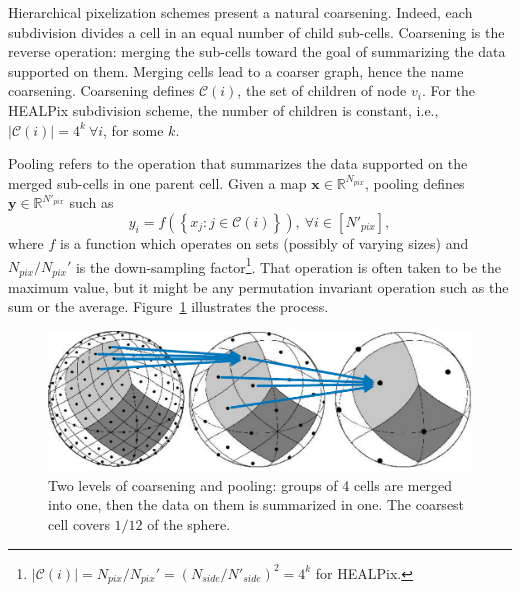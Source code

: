 \documentclass[final,twocolumn,3p,times,authoryear]{elsarticle}
\newcommand{\figref}[1]{Figure~\ref{fig:#1}}
\renewcommand{\b}[1]{{\bm{#1}}}   %
\newcommand{\1}{\b{1}}              %
\newcommand{\0}{\b{0}}              %
\newcommand{\C}{\mathcal{C}}
\newcommand{\x}{\b{x}}
\newcommand{\y}{\b{y}}
\newcommand{\R}{\mathbb{R}}
\begin{document}
Hierarchical pixelization schemes present a natural coarsening. Indeed, each subdivision divides a cell in an equal number of child sub-cells. Coarsening is the reverse operation: merging the sub-cells toward the goal of summarizing the data supported on them. Merging cells lead to a coarser graph, hence the name coarsening. Coarsening defines $\C(i)$, the set of children of node $v_i$. For the HEALPix subdivision scheme, the number of children is constant, i.e., $| \C(i) | = 4^k \ \forall i$, for some $k$.

Pooling refers to the operation that summarizes the data supported on the merged sub-cells in one parent cell. Given a map $\x \in \R^{N_{pix}}$, pooling defines $\y \in \R^{N'_{pix}}$ such as
\begin{equation} \label{eqn:pooling}
	y_i = f \left( \left\{ x_j : j \in \C(i) \right\} \right), \ \forall i \in [N'_{pix}],
\end{equation}
where $f$ is a function which operates on sets (possibly of varying sizes) and $N_{pix} / {N_{pix}}'$ is the down-sampling factor\footnote{$| \C(i) | = N_{pix} / {N_{pix}}' = (N_{side} / N'_{side})^2 = 4^k$ for HEALPix.}. That operation is often taken to be the maximum value, but it might be any permutation invariant operation such as the sum or the average. \figref{pooling} illustrates the process.


\begin{figure}
	\centering
	\includegraphics[width=\linewidth]{pooling}
	\caption{Two levels of coarsening and pooling: groups of 4 cells are merged into one, then the data on them is summarized in one. The coarsest cell covers $1/12$ of the sphere.}
	\label{fig:pooling}
\end{figure}
\end{document}
